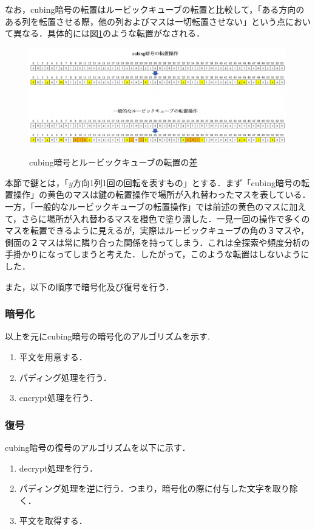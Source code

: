 \documentclass[a4j,titlepage]{jsarticle}
\begin{document}
なお，cubing暗号の転置はルービックキューブの転置と比較して，「ある方向のある列を転置させる際，他の列およびマスは一切転置させない」という点において異なる．具体的には図\ref{fig:trans-diff}のような転置がなされる．
\begin{figure}[htb]
  \centering
  \includegraphics[width=12cm]{./tex_pic/trans.png}\\
  \caption{cubing暗号とルービックキューブの転置の差}
  \label{fig:trans-diff}
\end{figure}
本節で鍵とは，「\(y\)方向1列1回の回転を表すもの」とする．まず「cubing暗号の転置操作」の黄色のマスは鍵の転置操作で場所が入れ替わったマスを表している．一方，「一般的なルービックキューブの転置操作」では前述の黄色のマスに加えて，さらに場所が入れ替わるマスを橙色で塗り潰した．一見一回の操作で多くのマスを転置できるように見えるが，実際はルービックキューブの角の３マスや，側面の２マスは常に隣り合った関係を持ってしまう．これは全探索や頻度分析の手掛かりになってしまうと考えた．したがって，このような転置はしないようにした．

また，以下の順序で暗号化及び復号を行う．
\subsubsection{暗号化}
以上を元にcubing暗号の暗号化のアルゴリズムを示す. 
\begin{screen}
  \begin{enumerate}
    \item 平文を用意する．
    \item パディング処理を行う．
    \item encrypt処理を行う．
  \end{enumerate}
\end{screen}

\subsubsection{復号}
cubing暗号の復号のアルゴリズムを以下に示す．
\begin{screen}
  \begin{enumerate}
    \item decrypt処理を行う．
    \item パディング処理を逆に行う．つまり，暗号化の際に付与した文字を取り除く．
    \item 平文を取得する．
  \end{enumerate}
\end{screen}
\end{document}
